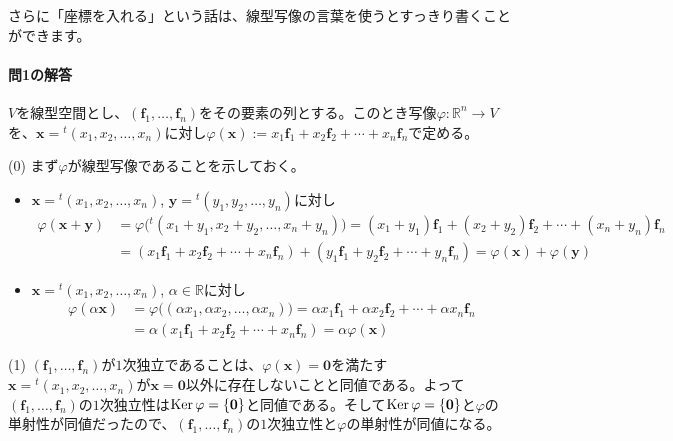 さらに「座標を入れる」という話は、線型写像の言葉を使うとすっきり書くことができます。


\paragraph{問1の解答}

$V$を線型空間とし、$(\bm{f}_1, \ldots, \bm{f}_n)$をその要素の列とする。このとき写像$\varphi\colon\mathbb{R}^n \rightarrow V$を、$\bm{x} = {}^t(x_1, x_2, \ldots, x_n)$に対し$\varphi(\bm{x}) := x_1\bm{f}_1 + x_2\bm{f}_2 + \cdots + x_n \bm{f}_n$で定める。

\noindent (0) まず$\varphi$が線型写像であることを示しておく。
\begin{itemize}
\item $\bm{x} = {}^t(x_1, x_2, \ldots, x_n)$, $\bm{y} = {}^t(y_1, y_2, \ldots, y_n)$に対し
\begin{align*}
\varphi(\bm{x} + \bm{y}) &= \varphi\bigl({}^t(x_1 + y_1, x_2 + y_2, \ldots, x_n + y_n)\bigr)
=(x_1 + y_1)\bm{f}_1 + (x_2 + y_2)\bm{f}_2 + \cdots + (x_n + y_n) \bm{f}_n \\
&= (x_1 \bm{f}_1 + x_2 \bm{f}_2 + \cdots + x_n \bm{f}_n) + (y_1 \bm{f}_1 + y_2 \bm{f}_2 + \cdots + y_n \bm{f}_n)
= \varphi(\bm{x}) + \varphi(\bm{y})
\end{align*}
\item $\bm{x} = {}^t(x_1, x_2, \ldots, x_n)$, $\alpha\in\mathbb{R}$に対し
\begin{align*}
\varphi(\alpha\bm{x})
&= \varphi\bigl((\alpha x_1, \alpha x_2, \ldots, \alpha x_n)\bigr)
= \alpha x_1 \bm{f}_1 + \alpha x_2 \bm{f}_2 + \cdots + \alpha x_n \bm{f}_n \\
&= \alpha(x_1 \bm{f}_1 + x_2 \bm{f}_2 + \cdots + x_n \bm{f}_n) = \alpha \varphi(\bm{x})
\end{align*}
\end{itemize}

\noindent (1) $(\bm{f}_1, \ldots, \bm{f}_n)$が$1$次独立であることは、$\varphi(\bm{x}) = \bm{0}$を満たす$\bm{x} = {}^t(x_1, x_2, \ldots, x_n)$が$\bm{x} = \bm{0}$以外に存在しないことと同値である。よって$(\bm{f}_1, \ldots, \bm{f}_n)$の$1$次独立性は$\operatorname{Ker} \varphi = \{\boldsymbol{0}\}$と同値である。そして$\operatorname{Ker} \varphi = \{\boldsymbol{0}\}$と$\varphi$の単射性が同値だったので、$(\bm{f}_1, \ldots, \bm{f}_n)$の$1$次独立性と$\varphi$の単射性が同値になる。

